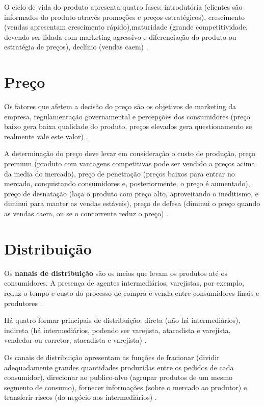 O ciclo de vida do produto apresenta quatro fases: introdutória (clientes são informados do produto através promoções e preços estratégicos), crescimento (vendas apresentam crescimento rápido),maturidade (grande competitividade, devendo ser lidada com marketing agressivo e diferenciação do produto ou estratégia de preços), declínio (vendas caem) \cite{maximiano}.


\section{Preço}

Os fatores que afetem a decisão do preço são os objetivos de marketing da empresa, regulamentação governamental e percepções dos consumidores (preço baixo gera baixa qualidade do produto, preços elevados gera questionamento se realmente vale este valor) \cite{maximiano}.


A determinação do preço deve levar em consideração o custo de produção, preço premium (produto com vantagens competitivas pode ser vendido a preços acima da media do mercado), preço de penetração (preços baixos para entrar no mercado, conquistando consumidores e, posteriormente, o preço é aumentado), preço de desnatação (laça o produto com preço alto, aproveitando o ineditismo, e diminui para manter as vendas estáveis), preço de defesa (diminui o preço quando as vendas caem, ou se o concorrente reduz o preço) \cite{maximiano}.

\section{Distribuição}


Os \textbf{nanais de distribuição}  são os meios que levam os produtos até os consumidores. A presença de  agentes intermediários, varejistas, por exemplo, reduz o tempo e custo do processo de compra e venda entre consumidores finais e produtores \cite{maximiano}.


Há quatro formar principais de distribuição: direta (não há intermediários), indireta (há intermediários, podendo ser varejista, atacadista e varejista, vendedor ou corretor, atacadista e varejista) \cite{maximiano}.


Os canais de distribuição apresentam as funções de fracionar (dividir adequadamente grandes quantidades produzidas entre os pedidos de cada consumidor), direcionar ao publico-alvo (agrupar produtos de um mesmo segmento de consumo), fornecer informações (sobre o mercado ao produtor) e transferir riscos (do negócio aos intermediários) \cite{maximiano}.



